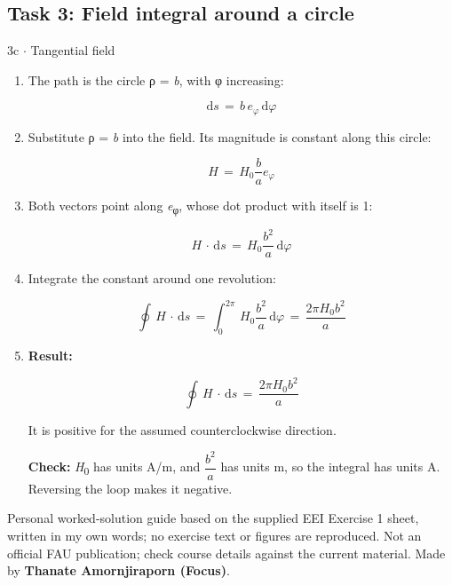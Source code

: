 \documentclass[11pt]{article}
\begin{document}
\begin{keepsection}\subsection{Task 3: Field integral around a circle}

\begin{workedbox}{3c \ensuremath{\cdot} Tangential field}
\begin{enumerate}
\item {}
The path is the circle ρ = \textit{b}, with φ increasing:

\begin{equation*}\mathrm{d}{s}\, =\, {b\,e}_{φ}\, \mathrm{d}{φ}\end{equation*}
\item {}
Substitute ρ = \textit{b} into the field. Its magnitude is constant along this circle:

\begin{equation*}{H}\, =\, {H}_{0}\dfrac{{b}}{{a}}{e}_{φ}\end{equation*}
\item {}
Both vectors point along \textit{e}\textsubscript{φ}, whose dot product with itself is 1:

\begin{equation*}{H}\, \cdot \, \mathrm{d}{s}\, =\, {H}_{0}\dfrac{{b}^{2}}{{a}}\, \mathrm{d}{φ}\end{equation*}
\item {}
Integrate the constant around one revolution:

\begin{equation*}\oint \, {H}\, \cdot \, \mathrm{d}{s}\, =\, \int_{0}^{2π} \, {H}_{0}\dfrac{{b}^{2}}{{a}}\, \mathrm{d}{φ}\, =\, \dfrac{2π{H}_{0}{b}^{2}}{{a}}\end{equation*}
\item {}
\textbf{Result:}

\begin{equation*}\oint \, {H}\, \cdot \, \mathrm{d}{s}\, =\, \dfrac{2π{H}_{0}{b}^{2}}{{a}}\end{equation*}

It is positive for the assumed counterclockwise direction.

\textbf{Check:} \textit{H}\textsubscript{0} has units A/m, and {\small\ensuremath{\dfrac{{b}^{2}}{{a}}}} has units m, so the integral has units A. Reversing the loop makes it negative.
\end{enumerate}
\end{workedbox}

\end{keepsection}

\vfill{\small Personal worked-solution guide based on the supplied EEI Exercise 1 sheet, written in my own words; no exercise text or figures are reproduced. Not an official FAU publication; check course details against the current material. Made by \textbf{Thanate Amornjiraporn (Focus)}.}
\end{document}
